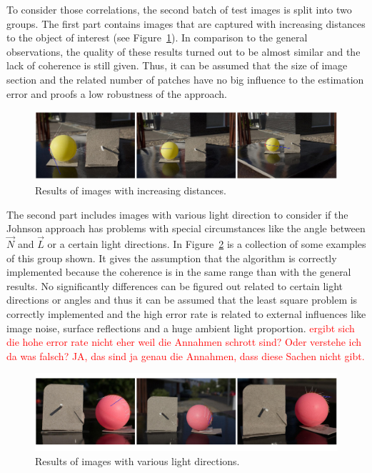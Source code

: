 To consider those correlations, the second batch of test images is split into two groups. The first part contains images that are captured with increasing distances to the object of interest (see Figure~\ref{fig:difDistance}). In comparison to the general observations, the quality of these results turned out to be almost similar and the lack of coherence is still given. Thus, it can be assumed that the size of image section and the related number of patches have no big influence to the estimation error and proofs a low robustness of the approach. 
\begin{figure}[H] 

	\center 
	\includegraphics[width=\linewidth]{Images/versch_Anstaende.jpg}
	\caption[Bildunterschrift]{Results of images with increasing distances.}
		\label{fig:difDistance}		
\end{figure}
The second part includes images with various light direction to consider if the Johnson approach has problems with special circumstances like the angle between $\vec{N}$ and $\vec{L}$ or a certain light directions. In Figure~\ref{fig:divLightDirect} is a collection of some examples of this group shown. It gives the assumption that the algorithm is correctly implemented because the coherence is in the same range than with the general results. No significantly differences can be figured out related to certain light directions or angles and thus it can be assumed that the least square problem is correctly implemented and the high error rate is related to external influences like image noise, surface reflections and a huge ambient light proportion. \textcolor{red}{ergibt sich die hohe error rate nicht eher weil die Annahmen schrott sind? Oder verstehe ich da was falsch? JA, das sind ja genau die Annahmen, dass diese Sachen nicht gibt.}
\begin{figure}[H] 

	\center 
	\includegraphics[width=\linewidth]{Images/versch_Lichtrichtungen.jpg}
	\caption[Bildunterschrift]{Results of images with various light directions.}
		\label{fig:divLightDirect}		
\end{figure}

